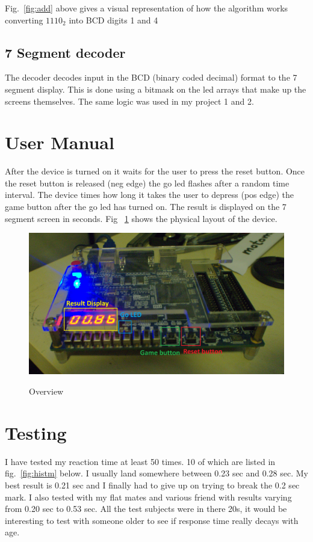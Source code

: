 \documentclass[paper=a4, fontsize=11pt]{scrartcl}
\numberwithin{equation}{section}		%
\numberwithin{figure}{section}			%
\numberwithin{table}{section}				%
\begin{document}
\begin{center}
Fig.~\ref{fig:add} above gives a visual representation of how the algorithm works converting $1110_2$ into BCD digits 1 and 4

\subsection{7 Segment decoder}

The decoder decodes input in the BCD (binary coded decimal) format to the 7 segment display. This is done using a bitmask on the led arrays that make up the screens themselves. The same logic was used in my project 1 and 2.



\section{User Manual}

After the device is turned on it waits for the user to press the reset button. Once the reset button is released (neg edge) the go led flashes after a random time interval. The device times how long it takes the user to depress (pos edge) the game button after the go led has turned on. The result is displayed on the 7 segment screen in seconds. Fig ~\ref{fig:unit} shows the physical layout of the device.

\begin{figure}[h!]
\centering
\caption{Overview}
\includegraphics[scale=0.6]{unit}
\label{fig:unit}
\end{figure}


\section{Testing}

I have tested my reaction time at least 50 times. 10 of which are listed in fig.~\ref{fig:histm} below. I usually land somewhere between 0.23 sec and 0.28 sec. My best result is 0.21 sec and I finally had to give up on trying to break the 0.2 sec mark. I also tested with my flat mates and various friend with results varying from 0.20 sec to 0.53 sec. All the test subjects were in there 20s, it would be interesting to test with someone older to see if response time really decays with age. 


\end{center}
\end{document}
